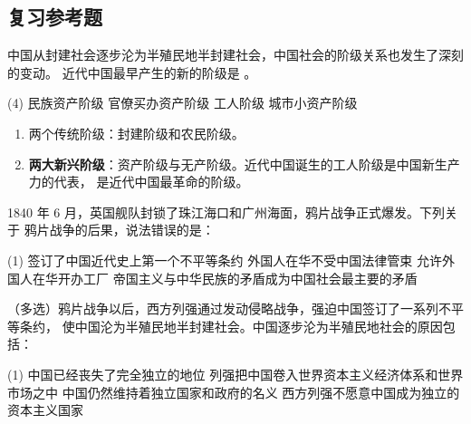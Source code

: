 \documentclass[10pt, UTF8]{book} %
\begin{document}
\subsection{复习参考题}

\begin{example}
    中国从封建社会逐步沦为半殖民地半封建社会，中国社会的阶级关系也发生了深刻的变动。
    近代中国最早产生的新的阶级是 \underline{\qquad \qquad \qquad}。
    \begin{tasks}[label={\Alph*. }](4)
        \task 民族资产阶级
        \task 官僚买办资产阶级
        \task 工人阶级
        \task 城市小资产阶级
    \end{tasks}
\end{example}

\begin{mdframed}[frametitle={鸦片战争的影响：中国社会的阶级变化}]
    \begin{enumerate}[itemsep=0pt]
        \item 两个传统阶级：封建阶级和农民阶级。
        \item \textbf{两大新兴阶级}：资产阶级与无产阶级。近代中国诞生的工人阶级是中国新生产力的代表，
        是近代中国最革命的阶级。
    \end{enumerate}
\end{mdframed}

\begin{example}
    1840 年 6 月，英国舰队封锁了珠江海口和广州海面，鸦片战争正式爆发。下列关于
    鸦片战争的后果，说法错误的是：
    \begin{tasks}[label={\Alph*. }](1)
        \task 签订了中国近代史上第一个不平等条约
        \task 外国人在华不受中国法律管束
        \task 允许外国人在华开办工厂
        \task 帝国主义与中华民族的矛盾成为中国社会最主要的矛盾
    \end{tasks}
\end{example}

\begin{example}
    （多选）鸦片战争以后，西方列强通过发动侵略战争，强迫中国签订了一系列不平等条约，
    使中国沦为半殖民地半封建社会。中国逐步沦为半殖民地社会的原因包括：
    \begin{tasks}[label={\Alph*. }](1)
        \task 中国已经丧失了完全独立的地位
        \task 列强把中国卷入世界资本主义经济体系和世界市场之中
        \task 中国仍然维持着独立国家和政府的名义
        \task 西方列强不愿意中国成为独立的资本主义国家
    \end{tasks}
\end{example}
\end{document}
